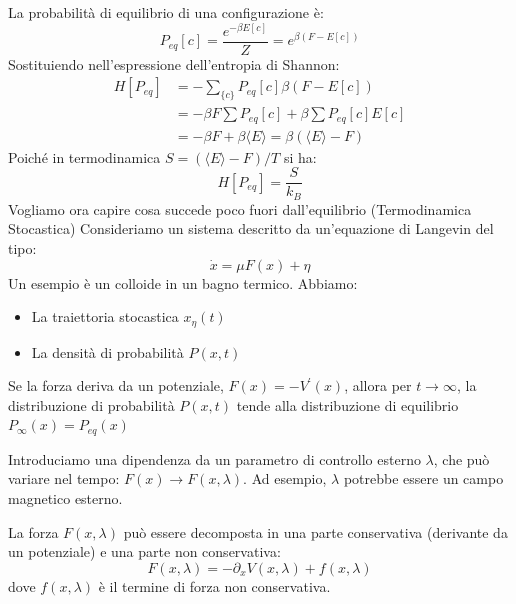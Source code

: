 \noindent La probabilità di equilibrio di una configurazione è:
\begin{equation}
P_{eq}[c]=\frac{e^{-\beta E[c]}}{Z}=e^{\beta (F-E[c])}
\end{equation}
Sostituiendo nell'espressione dell'entropia di Shannon:
\begin{align}
H[P_{eq}]&=-\sum_{\{c\}}P_{eq}[c] \beta (F-E[c]) \nonumber \\ 
&= -\beta F \sum P_{eq}[c] + \beta \sum P_{eq}[c]E[c] \nonumber \\ 
& =-\beta F + \beta \langle E \rangle = \beta (\langle E \rangle - F)
\end{align}
Poiché in termodinamica $S = (\langle E \rangle - F)/T$ si ha:
\begin{equation}
H[P_{eq}]=\frac{S}{k_{B}}
\end{equation}
Vogliamo ora capire cosa succede poco fuori dall'equilibrio (Termodinamica Stocastica)
Consideriamo un sistema descritto da un'equazione di Langevin del tipo:
\begin{equation}
\dot{x}=\mu F(x)+\eta
\end{equation}
Un esempio è un colloide in un bagno termico.
Abbiamo:
\begin{itemize}
    \item La traiettoria stocastica $x_{\eta}(t)$
    \item La densità di probabilità $P(x,t)$
\end{itemize}
Se la forza deriva da un potenziale, $F(x)=-V^{\prime}(x)$, allora per $t \rightarrow \infty$, la distribuzione di probabilità $P(x,t)$ tende alla distribuzione di equilibrio $P_{\infty}(x)=P_{eq}(x)$

\noindent Introduciamo una dipendenza da un parametro di controllo esterno $\lambda$, che può variare nel tempo: $F(x) \rightarrow F(x,\lambda)$. Ad esempio, $\lambda$ potrebbe essere un campo magnetico esterno.

\noindent La forza $F(x,\lambda)$ può essere decomposta in una parte conservativa (derivante da un potenziale) e una parte non conservativa:
\begin{equation}
F(x,\lambda)=-\partial_{x}V(x,\lambda)+f(x,\lambda)
\end{equation}
dove $f(x,\lambda)$ è il termine di forza non conservativa.

